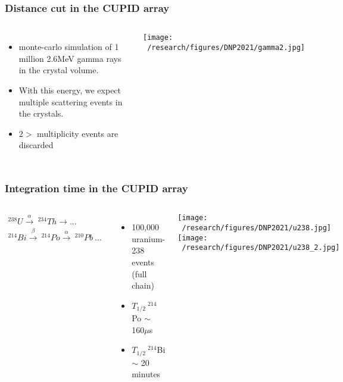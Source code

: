 \documentclass{beamer}
\begin{document}
	\begin{frame}
		\frametitle{Distance cut in the CUPID array}
		\begin{columns}[c] %
			
			\begin{itemize}
				\setlength\itemsep{2em}
				\item monte-carlo simulation of 1 million 2.6MeV gamma rays in the crystal volume.
				\item With this energy, we expect multiple scattering events in the crystals.
				\item $2>$ multiplicity events are discarded
			\end{itemize}
			
			
			\texttt{[image: ~/research/figures/DNP2021/gamma2.jpg]}
			
			
		\end{columns}
	\end{frame}



	\begin{frame}
		\frametitle{Integration time in the CUPID array}
		\begin{columns}[c] %
			
			\begin{eqnarray*}
			^{238}U \xrightarrow{\alpha} \  ^{234}Th \xrightarrow \  ... \\ ^{214}Bi \xrightarrow{\beta} \  ^{214}Po \xrightarrow{\alpha} \ ^{210}Pb \ ...
			\end{eqnarray*}
			\begin{itemize}
				\setlength\itemsep{2em}
				\item 100,000 uranium-238 events (full chain)
				\item $T_{1/2} \ ^{214}$Po $\sim$ 160$\mu$s
				\item $T_{1/2} \ ^{214}$Bi $\sim$ 20 minutes
			\end{itemize}
			
			\hspace*{0.3cm}\texttt{[image: ~/research/figures/DNP2021/u238.jpg]}
			\medskip\medskip
			\hspace*{0.3cm}\texttt{[image: ~/research/figures/DNP2021/u238\_2.jpg]}
			
		\end{columns}
	\end{frame}
\end{document}

